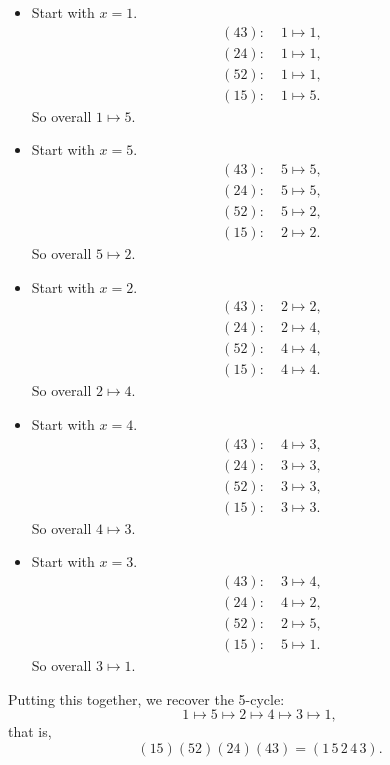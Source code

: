 \documentclass[12pt]{article}
\begin{document}
	\begin{itemize}
		\item Start with $x=1$.
		\begin{align*}
			(43): &\; 1 \mapsto 1, \\
			(24): &\; 1 \mapsto 1, \\
			(52): &\; 1 \mapsto 1, \\
			(15): &\; 1 \mapsto 5.
		\end{align*}
		So overall $1 \mapsto 5$.
		
		\item Start with $x=5$.
		\begin{align*}
			(43): &\; 5 \mapsto 5, \\
			(24): &\; 5 \mapsto 5, \\
			(52): &\; 5 \mapsto 2, \\
			(15): &\; 2 \mapsto 2.
		\end{align*}
		So overall $5 \mapsto 2$.
		
		\item Start with $x=2$.
		\begin{align*}
			(43): &\; 2 \mapsto 2, \\
			(24): &\; 2 \mapsto 4, \\
			(52): &\; 4 \mapsto 4, \\
			(15): &\; 4 \mapsto 4.
		\end{align*}
		So overall $2 \mapsto 4$.
		
		\item Start with $x=4$.
		\begin{align*}
			(43): &\; 4 \mapsto 3, \\
			(24): &\; 3 \mapsto 3, \\
			(52): &\; 3 \mapsto 3, \\
			(15): &\; 3 \mapsto 3.
		\end{align*}
		So overall $4 \mapsto 3$.
		
		\item Start with $x=3$.
		\begin{align*}
			(43): &\; 3 \mapsto 4, \\
			(24): &\; 4 \mapsto 2, \\
			(52): &\; 2 \mapsto 5, \\
			(15): &\; 5 \mapsto 1.
		\end{align*}
		So overall $3 \mapsto 1$.
	\end{itemize}
	
	Putting this together, we recover the 5-cycle:
	$$
	1 \mapsto 5 \mapsto 2 \mapsto 4 \mapsto 3 \mapsto 1,
	$$
	that is,
	$$
	(15)(52)(24)(43) = (1\,5\,2\,4\,3).
	$$
	
\end{document}
